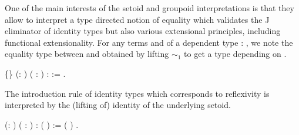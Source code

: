   One of the main interests of the setoid and groupoid interpretations is that they
  allow to interpret a type directed notion of equality which validates 
  the J eliminator of identity types but also various extensional principles,
  including functional extensionality. 
  For any terms  and  of a dependent type : , we note    the equality type
  between  and  obtained by lifting $\sim_1$ to get a type depending on .
\begin{coqdoccode}
\coqdocemptyline
\coqdocnoindent
{}  \{\} (:  ) (  :  ) \coqdoceol
\coqdocindent{1.00em}
:   := \coqdocnotation{(} \coqdocvar{$\gamma$} \coqdocnotation{(} \coqdocnotation{$\star$} \coqdocvariable{$\gamma$}   \coqdocnotation{$\star$} \coqdocvariable{$\gamma$} \coqdocnotation{;} \coqdocvar{\_}\coqdocnotation{);}    \coqdocnotation{)}.\coqdoceol
\coqdocemptyline
\coqdocemptyline
\end{coqdoccode}
The introduction rule of identity types which corresponds to reflexivity is interpreted by the (lifting of) identity of the underlying setoid. \begin{coqdoccode}
\coqdocemptyline
\coqdocnoindent
{}   (:  ) ( :  ) \coqdoceol
\coqdocindent{1.00em}
:  (  ) := \coqdocnotation{(} \coqdocvar{$\gamma$}  ( \coqdocnotation{$\star$} \coqdocvariable{$\gamma$})\coqdocnotation{;}  \coqdocvar{\_} \coqdocvar{\_} \coqdocvar{\_}\coqdocnotation{)}.\coqdoceol
\coqdocemptyline
\coqdocemptyline
\end{coqdoccode}
